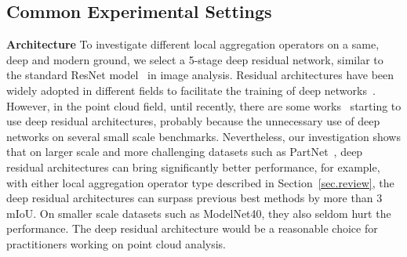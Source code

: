 \documentclass[runningheads]{llncs}
\begin{document}
\subsection{Common Experimental Settings}

\vspace{0.3em} \noindent \textbf{Architecture} To investigate different local aggregation operators on a same, deep and modern ground, we select a 5-stage deep residual network, similar to the standard ResNet model~\cite{he2015deep} in image analysis. Residual architectures have been widely adopted in different fields to facilitate the training of deep networks~\cite{he2015deep,vaswani2017attention}. However, in the point cloud field, until recently, there are some works~\cite{thomas2019kpconv,li2019can} starting to use deep residual architectures, probably because the unnecessary use of deep networks on several small scale benchmarks. Nevertheless, our investigation shows that on larger scale and more challenging datasets such as PartNet~\cite{mo2019partnet}, deep residual architectures can bring significantly better performance, for example, with either local aggregation operator type described in Section~\ref{sec.review}, the deep residual architectures can surpass previous best methods by more than 3 mIoU. On smaller scale datasets such as ModelNet40, they also seldom hurt the performance. The deep residual architecture would be a reasonable choice for practitioners working on point cloud analysis.
\end{document}
